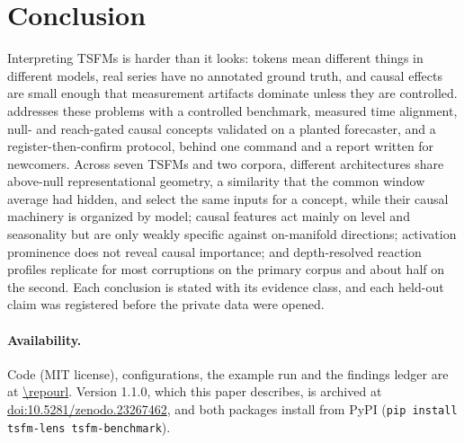 \section{Conclusion}
\label{sec:conclusion}

Interpreting TSFMs is harder than it looks: tokens mean different things in different models, real series have no
annotated ground truth, and causal effects are small enough that measurement artifacts dominate unless they are
controlled. \tool{} addresses these problems with a controlled benchmark, measured time alignment, null- and reach-gated
causal concepts validated on a planted forecaster, and a register-then-confirm protocol, behind one command and a report
written for newcomers. Across seven TSFMs and two corpora, different architectures share above-null representational geometry, a
similarity that the common window average had hidden, and select the same inputs for a concept, while their causal
machinery is organized by model; causal features act mainly on level and seasonality but are only
weakly specific against on-manifold directions; activation prominence does not reveal causal importance; and
depth-resolved reaction profiles replicate for most corruptions on the primary corpus and about half on the second. Each conclusion is stated with its evidence class, and each held-out
claim was registered before the private data were opened.

\paragraph{Availability.} Code (MIT license), configurations, the example run and the findings ledger are at
\url{\repourl}. Version 1.1.0, which this paper describes, is archived
at \href{https://doi.org/10.5281/zenodo.23267462}{doi:10.5281/zenodo.23267462}, and both packages install from PyPI
(\texttt{pip install tsfm-lens tsfm-benchmark}).
